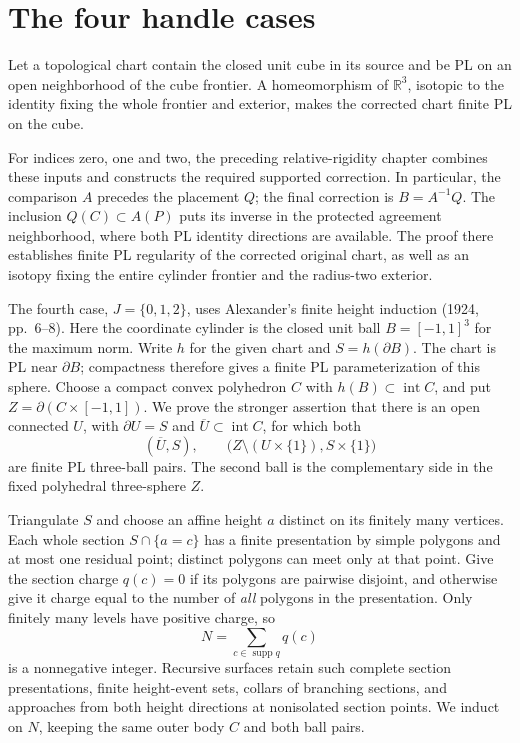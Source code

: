 \section{The four handle cases}
\label{sec:handle-cases}

\begin{theorem}
\label{thm:smoothing-index-three}
Let a topological chart contain the closed unit cube in its source and
be PL on an open neighborhood of the cube frontier. A homeomorphism
of $\mathbb R^3$, isotopic to the identity fixing the whole frontier
and exterior, makes the corrected chart finite PL on the cube.
\end{theorem}

For indices zero, one and two, the preceding relative-rigidity chapter
combines these inputs and constructs the required supported correction.
In particular, the comparison $A$ precedes the placement $Q$; the final
correction is $B=A^{-1}Q$. The inclusion $Q(C)\subset A(P)$ puts its
inverse in the protected agreement neighborhood, where both PL identity
directions are available. The proof there establishes finite PL regularity
of the corrected original chart, as well as an isotopy fixing the entire
cylinder frontier and the radius-two exterior.

The fourth case, $J=\{0,1,2\}$, uses Alexander's finite height induction
(1924, pp.~6--8). Here the coordinate cylinder is the closed unit ball
$B=[-1,1]^3$ for the maximum norm. Write $h$ for the given chart and
$S=h(\partial B)$. The chart is PL near $\partial B$; compactness therefore
gives a finite PL parameterization of this sphere. Choose a compact convex
polyhedron $C$ with $h(B)\subset\operatorname{int}C$, and put
$Z=\partial(C\times[-1,1])$. We prove the stronger assertion that there
is an open connected $U$, with $\partial U=S$ and
$\overline U\subset\operatorname{int}C$, for which both
\[
 (\overline U,S),\qquad
 \bigl(Z\setminus(U\times\{1\}),S\times\{1\}\bigr)
\]
are finite PL three-ball pairs. The second ball is the complementary side
in the fixed polyhedral three-sphere $Z$.

Triangulate $S$ and choose an affine height $a$ distinct on its finitely
many vertices. Each whole section $S\cap\{a=c\}$ has a finite presentation
by simple polygons and at most one residual point; distinct polygons can
meet only at that point. Give the section charge $q(c)=0$ if its polygons
are pairwise disjoint, and otherwise give it charge equal to the number of
\emph{all} polygons in the presentation. Only finitely many levels have
positive charge, so
\[
 N=\sum_{c\in\operatorname{supp}q}q(c)
\]
is a nonnegative integer. Recursive surfaces retain such complete section
presentations, finite height-event sets, collars of branching sections,
and approaches from both height directions at nonisolated section points.
We induct on $N$, keeping the same outer body $C$ and both ball pairs.

